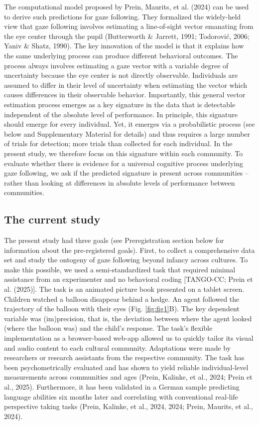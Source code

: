 \documentclass[
  man,floatsintext]{apa7}
\begin{document}
The computational model proposed by Prein, Maurits, et al. (2024) can be used to derive such predictions for gaze following. They formalized the widely-held view that gaze following involves estimating a line-of-sight vector emanating from the eye center through the pupil (Butterworth \& Jarrett, 1991; Todorović, 2006; Yaniv \& Shatz, 1990). The key innovation of the model is that it explains how the same underlying process can produce different behavioral outcomes. The process always involves estimating a gaze vector with a variable degree of uncertainty because the eye center is not directly observable. Individuals are assumed to differ in their level of uncertainty when estimating the vector which causes differences in their observable behavior. Importantly, this general vector estimation process emerges as a key signature in the data that is detectable independent of the absolute level of performance. In principle, this signature should emerge for every individual. Yet, it emerges via a probabilistic process (see below and Supplementary Material for details) and thus requires a large number of trials for detection; more trials than collected for each individual. In the present study, we therefore focus on this signature within each community. To evaluate whether there is evidence for a universal cognitive process underlying gaze following, we ask if the predicted signature is present across communities -- rather than looking at differences in absolute levels of performance between communities.

\subsection{The current study}\label{the-current-study}

The present study had three goals (see Preregistration section below for information about the pre-registered goals). First, to collect a comprehensive data set and study the ontogeny of gaze following beyond infancy across cultures. To make this possible, we used a semi-standardized task that required minimal assistance from an experimenter and no behavioral coding {[}TANGO-CC; Prein et al. (2025){]}. The task is an animated picture book presented on a tablet screen. Children watched a balloon disappear behind a hedge. An agent followed the trajectory of the balloon with their eyes (Fig. \ref{fig:fig1}B). The key dependent variable was (im)precision, that is, the deviation between where the agent looked (where the balloon was) and the child's response. The task's flexible implementation as a browser-based web-app allowed us to quickly tailor its visual and audio content to each cultural community. Adaptations were made by researchers or research assistants from the respective community. The task has been psychometrically evaluated and has shown to yield reliable individual-level measurements across communities and ages (Prein, Kalinke, et al., 2024; Prein et al., 2025). Furthermore, it has been validated in a German sample predicting language abilities six months later and correlating with conventional real-life perspective taking tasks (Prein, Kalinke, et al., 2024, 2024; Prein, Maurits, et al., 2024).
\end{document}
